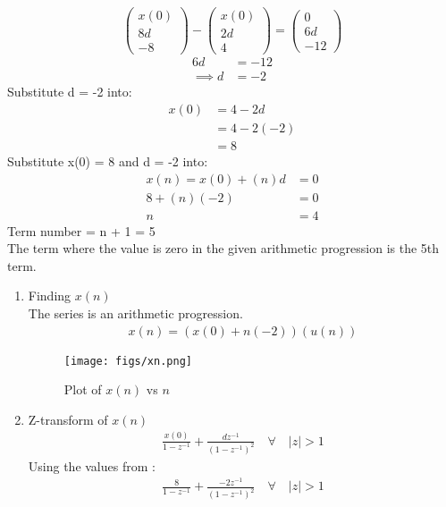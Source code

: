 \documentclass[journal,12pt,twocolumn]{IEEEtran}
\theoremstyle{remark}
\begin{document}
\begin{equation}
\left(
\begin{array}{r}
x(0) \\
8d \\
-8 
\end{array}
\right)
-
\left(
\begin{array}{r}
x(0) \\
2d \\
4
\end{array}
\right)
=
\left(
\begin{array}{r}
0 \\
6d \\
-12
\end{array}
\right)
\end{equation}
\begin{align}
6d &= -12 \\
\implies d &= -2 
\end{align}
Substitute d = -2 into:
\begin{align}
x(0) &= 4 - 2d\\
&= 4 - 2(-2)\\
&= 8
\end{align}
Substitute x(0) = 8 and d = -2 into:
\begin{align}
x(n) = x(0) + (n)d &= 0 \\
8 + (n)(-2) &= 0 \\
n &= 4
\end{align}
Term number = n + 1 = 5 \\
The term where the value is zero in the given arithmetic progression is the 5th term.\\
\begin{enumerate}
\item Finding $x(n)$ \\
The series is an arithmetic progression.
\begin{align}
x(n) = (x(0) + n(-2))(u(n))
\end{align}
\begin{figure}[h!]
    \centering
    \texttt{[image: figs/xn.png]}
    \caption{Plot of $x(n)$ vs $n$}
    \label{fig:1}
\end{figure}
\item Z-transform of $x(n)$ \\
\begin{align}
\frac{x(0)}{1 - z^{-1}} + \frac{dz^{-1}}{(1 - z^{-1})^2} \quad \forall \quad |z| > 1
\end{align}
Using the values from :
\begin{align}
\frac{8}{1 - z^{-1}} + \frac{-2z^{-1}}{(1 - z^{-1})^2} \quad \forall \quad |z| > 1
\end{align}
\end{enumerate}
\end{document}
